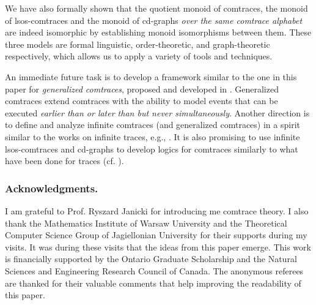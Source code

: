 \documentclass{llncs}
\begin{document}
We have also formally shown that the quotient monoid of comtraces, the monoid of lsos-comtraces and the monoid of cd-graphs \emph{over the same comtrace alphabet} are indeed isomorphic by establishing monoid isomorphisms between them. These three models are  formal linguistic,  order-theoretic, and  graph-theoretic respectively, which allows us to apply a variety of tools and techniques. 

An immediate future task is to develop a framework similar to the one in this paper for \emph{generalized comtraces}, proposed and developed in \cite{JL08,Le,JL09}. Generalized comtraces extend comtraces with the ability to model events that can be executed \emph{earlier than or later than but never simultaneously}. Another direction is to define and analyze infinite comtraces (and generalized comtraces) in a spirit similar  to the works on infinite traces, e.g., \cite{Gas90,Die91}. It is also promising to use infinite lsos-comtraces and cd-graphs  to develop logics for comtraces similarly to what have been done for traces (cf. \cite{TW02,DHK07}). 

\subsubsection*{Acknowledgments.} I am grateful to Prof. Ryszard Janicki for introducing me  comtrace theory. I also thank the Mathematics Institute of Warsaw University and the Theoretical Computer Science Group of Jagiellonian University for their supports during my visits. It was during these visits that the ideas from this paper emerge. This work is financially  supported by the Ontario Graduate Scholarship and the Natural Sciences and Engineering Research Council of Canada. The anonymous referees are thanked for their valuable comments that help improving the readability of this paper.
\end{document}
